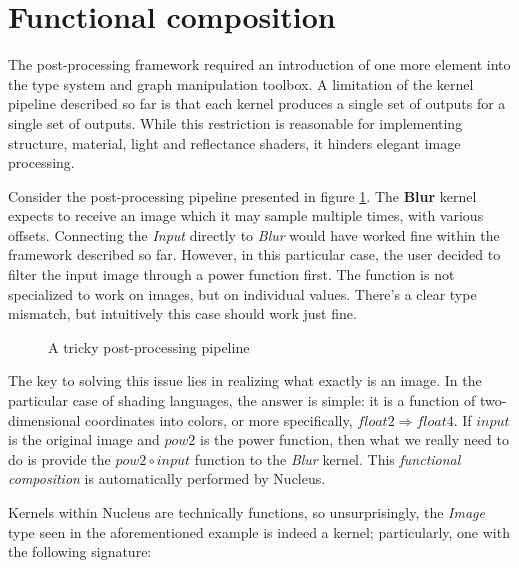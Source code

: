 
\section{Functional composition}
\label{sec:FunctionalComposition}

The post-processing framework required an introduction of one more element into the type system and graph manipulation toolbox. A limitation of the kernel pipeline described so far is that each kernel produces a single set of outputs for a single set of outputs. While this restriction is reasonable for implementing structure, material, light and reflectance shaders, it hinders elegant image processing.

Consider the post-processing pipeline presented in figure \ref{fig:TrickyPostProc}. The \textbf{Blur} kernel expects to receive an image which it may sample multiple times, with various offsets. Connecting the \emph{Input} directly to \emph{Blur} would have worked fine within the framework described so far. However, in this particular case, the user decided to filter the input image through a power function first. The function is not specialized to work on images, but on individual values. There's a clear type mismatch, but intuitively this case should work just fine.

\begin{figure}[h!]
  \centering
    \caption[A tricky post-processing pipeline]{A tricky post-processing pipeline}
  \label{fig:TrickyPostProc}
\end{figure}

The key to solving this issue lies in realizing what exactly is an image. In the particular case of shading languages, the answer is simple: it is a function of two-dimensional coordinates into colors, or more specifically, $float2 \Rightarrow float4$. If $input$ is the original image and $pow2$ is the power function, then what we really need to do is provide the $pow2 \circ input$ function to the \emph{Blur} kernel. This \emph{functional composition} is automatically performed by Nucleus.

Kernels within Nucleus are technically functions, so unsurprisingly, the \emph{Image} type seen in the aforementioned example is indeed a kernel; particularly, one with the following signature:
	
